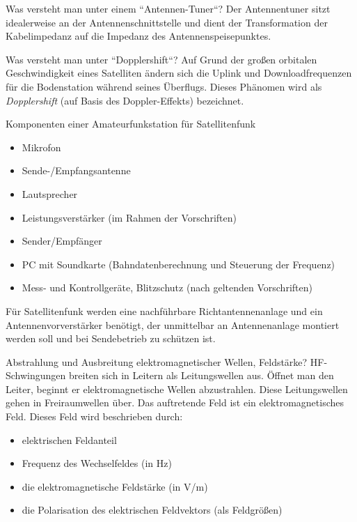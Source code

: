 \documentclass[avery5371,grid,frame,a4paper]{flashcards}
\newcommand{\card}[3]{
  \begin{flashcard}[{\chap} -- #1]{#2}#3\end{flashcard}
}
\begin{document}
\card{47}{Was versteht man unter einem ``Antennen-Tuner``?}{
  Der Antennentuner sitzt idealerweise an der Antennenschnittstelle und dient der Transformation der Kabelimpedanz auf die Impedanz des Antennenspeisepunktes.
}
\card{48}{Was versteht man unter ``Dopplershift``?}{
  Auf Grund der großen orbitalen Geschwindigkeit eines Satelliten ändern sich die Uplink und Downloadfrequenzen für die Bodenstation während seines Überflugs. Dieses Phänomen wird als \emph{Dopplershift} (auf Basis des Doppler-Effekts) bezeichnet.}
\card{49}{Komponenten einer Amateurfunkstation für Satellitenfunk}{
  \footnotesize
  \vspace{2pt}
  \begin{minipage}{0.43\textwidth}
    \begin{itemize}
      \item Mikrofon
      \item Sende-/Empfangsantenne
      \item Lautsprecher
      \item Leistungsverstärker (im Rahmen der Vorschriften)
    \end{itemize}
  \end{minipage}
  \begin{minipage}{0.56\textwidth}
    \begin{itemize}
      \item Sender/Empfänger
      \item PC mit Soundkarte (Bahndatenberechnung und Steuerung der Frequenz)
      \item Mess- und Kontrollgeräte, Blitzschutz (nach geltenden Vorschriften)
    \end{itemize}
  \end{minipage}

  \vspace{10pt}
  Für Satellitenfunk werden eine nachführbare Richtantennenanlage und ein Antennenvorverstärker benötigt, der unmittelbar an Antennenanlage montiert werden soll und bei Sendebetrieb zu schützen ist.
}
\card{50}{Abstrahlung und Ausbreitung elektromagnetischer Wellen, Feldstärke?}{
  \small
  HF-Schwingungen breiten sich in Leitern als Leitungswellen aus. Öffnet man den Leiter, beginnt er elektromagnetische Wellen abzustrahlen. Diese Leitungswellen gehen in Freiraumwellen über. Das auftretende Feld ist ein elektromagnetisches Feld. Dieses Feld wird beschrieben durch:
  \begin{itemize}
    \item elektrischen Feldanteil
    \item Frequenz des Wechselfeldes (in Hz)
    \item die elektromagnetische Feldstärke (in V/m)
    \item die Polarisation des elektrischen Feldvektors (als Feldgrößen)
  \end{itemize}
}
\end{document}
